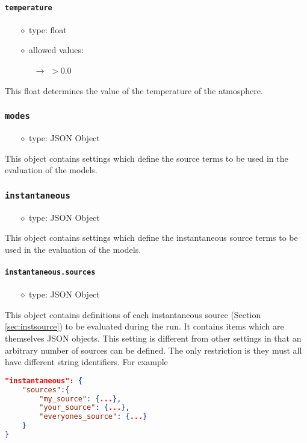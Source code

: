 \documentclass[]{article}
\def\code#1{\texttt{#1}}
\begin{document}
\paragraph{\code{temperature}}\label{sec:temperature}
\begin{itemize}
    \item[$\diamond$] type: float 
    \item[$\diamond$] allowed values:
    \begin{itemize}
        \item[$\rightarrow$] $>0.0$ 
    \end{itemize}
\end{itemize}
This float determines the value of the temperature of the atmosphere.

\subsubsection{\code{modes}}
\begin{itemize}
    \item[$\diamond$] type: JSON Object 
\end{itemize}
This object contains settings which define the source terms to be used in the
evaluation of the models.

\subsubsection{\code{instantaneous}}
\begin{itemize}
    \item[$\diamond$] type: JSON Object 
\end{itemize}
This object contains settings which define the instantaneous source terms to be
used in the evaluation of the models.

\paragraph{\code{instantaneous.sources}}\label{sec:instsources}
\begin{itemize}
    \item[$\diamond$] type: JSON Object 
\end{itemize}
This object contains definitions of each instantaneous source (Section
\ref{sec:instsource}) to be evaluated during the run. It contains items which
are themselves JSON objects. This setting is different from other settings in
that an arbitrary number of sources can be defined. The only restriction is they
must all have different string identifiers. For example\\
\begin{lstlisting}[language=json,firstnumber=1]
"instantaneous": {
    "sources":{
        "my_source": {...},
        "your_source": {...},
        "everyones_source": {...}
    }
}
\end{lstlisting}
\medskip
\end{document}
